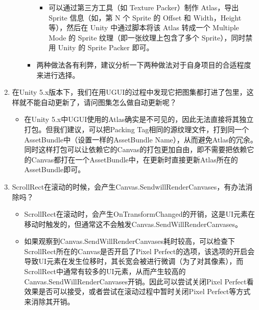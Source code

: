 \documentclass[9pt, b5paper]{article}
\begin{document}
\begin{enumerate}
\begin{itemize}
\begin{itemize}
\begin{itemize}
\item 可以通过第三方工具（如 Texture Packer）制作 Atlas，导出 Sprite 信息（如，第 N 个 Sprite 的 Offset 和 Width，Height 等），然后在 Unity 中通过脚本将该 Atlas 转成一个 Multiple Mode 的 Sprite 纹理（即一张纹理上包含了多个 Sprite），同时禁用 Unity 的 Sprite Packer 即可。
\end{itemize}
\item 两种做法各有利弊，建议分析一下两种做法对于自身项目的合适程度来进行选择。
\end{itemize}
\end{itemize}
\item 在Unity 5.x版本下，我们在用UGUI的过程中发现它把图集都打进了包里，这样就不能自动更新了，请问图集怎么做自动更新呢？
\label{sec:orgc272ac4}
\begin{itemize}
\item 在Unity 5.x中UGUI使用的Atlas确实是不可见的，因此无法直接将其独立打包。但我们建议，可以把Packing Tag相同的源纹理文件，打到同一个AssetBundle中（设置一样的AssetBundle Name），从而避免Atlas的冗余。同时这样打包可以让依赖它的Canvas的打包更加自由，即不需要把依赖它的Canvas都打在一个AssetBundle中，在更新时直接更新Atlas所在的AssetBundle即可。
\end{itemize}
\item ScrollRect在滚动的时候，会产生Canvas.SendwillRenderCanvases，有办法消除吗？
\label{sec:org219354d}
\begin{itemize}
\item ScrollRect在滚动时，会产生OnTransformChanged的开销，这是UI元素在移动时触发的，但通常这不会触发Canvas.SendWillRenderCanvases。
\item 如果观察到Canvas.SendWillRenderCanvases耗时较高，可以检查下ScrollRect所在的Canvas是否开启了Pixel Perfect的选项，该选项的开启会导致UI元素在发生位移时，其长宽会被进行微调（为了对其像素），而ScrollRect中通常有较多的UI元素，从而产生较高的Canvas.SendWillRenderCanvases开销。因此可以尝试关闭Pixel Perfect看效果是否可以接受，或者尝试在滚动过程中暂时关闭Pixel Perfect等方式来消除其开销。
\end{itemize}
\end{enumerate}
\end{document}
